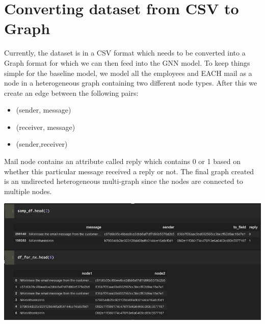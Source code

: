 
\chapter{Converting dataset from CSV to Graph} %

\label{AppendixB} %

Currently, the dataset is in a CSV format which needs to be converted into a Graph format for which we can then feed into the GNN model.
To keep things simple for the baseline model, we model all the employees and EACH mail as a node in a heterogeneous graph containing two different node types. After this we create an edge between the following pairs:

\begin{itemize}[noitemsep,topsep=0pt]
    \item (sender, message)
    \item (receiver, message)
    \item (sender,receiver)
\end{itemize}

Mail node contains an attribute called reply which contains 0 or 1 based on whether this particular message received a reply or not.
The final graph created is an undirected heterogeneous multi-graph since the nodes are connected to multiple nodes.

\begin{center}
\includegraphics[scale=0.75]{Appendices/image1_graph.JPG}
\end{center}

